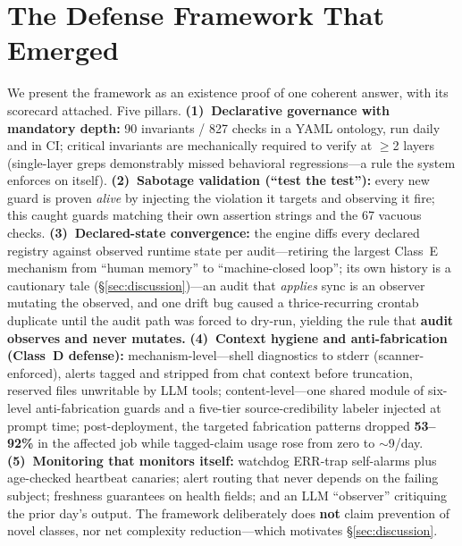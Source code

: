 \documentclass[conference]{IEEEtran}
\begin{document}
\section{The Defense Framework That Emerged}\label{sec:defense}
We present the framework as an existence proof of one coherent answer,
with its scorecard attached. Five pillars. \textbf{(1)~Declarative
governance with mandatory depth:} 90 invariants / 827 checks in a YAML
ontology, run daily and in CI; critical invariants are mechanically
required to verify at $\geq$2 layers (single-layer greps demonstrably
missed behavioral regressions---a rule the system enforces on itself).
\textbf{(2)~Sabotage validation (``test the test''):} every new guard is
proven \emph{alive} by injecting the violation it targets and observing it
fire; this caught guards matching their own assertion strings and the 67
vacuous checks. \textbf{(3)~Declared-state convergence:} the engine diffs
every declared registry against observed runtime state per audit---retiring
the largest Class~E mechanism from ``human memory'' to ``machine-closed
loop''; its own history is a cautionary tale (\S\ref{sec:discussion})---an
audit that \emph{applies} sync is an observer mutating the observed, and
one drift bug caused a thrice-recurring crontab duplicate until the audit
path was forced to dry-run, yielding the rule that \textbf{audit observes
and never mutates.} \textbf{(4)~Context hygiene and anti-fabrication
(Class~D defense):} mechanism-level---shell diagnostics to stderr
(scanner-enforced), alerts tagged and stripped from chat context before
truncation, reserved files unwritable by LLM tools; content-level---one
shared module of six-level anti-fabrication guards and a five-tier
source-credibility labeler injected at prompt time; post-deployment, the
targeted fabrication patterns dropped \textbf{53--92\%} in the affected
job while tagged-claim usage rose from zero to $\sim$9/day.
\textbf{(5)~Monitoring that monitors itself:} watchdog ERR-trap
self-alarms plus age-checked heartbeat canaries; alert routing that never
depends on the failing subject; freshness guarantees on health fields; and
an LLM ``observer'' critiquing the prior day's output. The framework
deliberately does \textbf{not} claim prevention of novel classes, nor net
complexity reduction---which motivates \S\ref{sec:discussion}.
\end{document}
